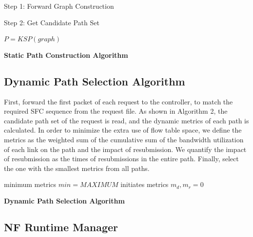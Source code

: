 \documentclass[10pt, conference, letterpaper]{IEEEtran}
\begin{document}
\begin{algorithm}[h]


Step 1: Forward Graph Construction


Step 2: Get Candidate Path Set

$P = KSP(graph)$
\caption{{\bf Static Path Construction Algorithm} \label{construction}}
\end{algorithm}


\subsection{Dynamic Path Selection Algorithm}

First, forward the first packet of each request to the controller, to match the required SFC sequence from the request file. As shown in Algorithm 2, the candidate path set of the request is read, and the dynamic metrics of each path is calculated. In order to minimize the extra use of flow table space, we define the metrics as the weighted sum of the cumulative sum of the bandwidth utilization of each link on the path and the impact of resubmission. We quantify the impact of resubmission as the times of resubmissions in the entire path. Finally, select the one with the smallest metrics from all paths.


\begin{algorithm}[h]

\nl minimum metrics $min = MAXIMUM$\;
\nl initiates metrics $m_d, m_r = 0$ \;

\caption{{\bf Dynamic Path Selection Algorithm} \label{Dynamic}}
\end{algorithm}



\subsection{NF Runtime Manager}
\end{document}
